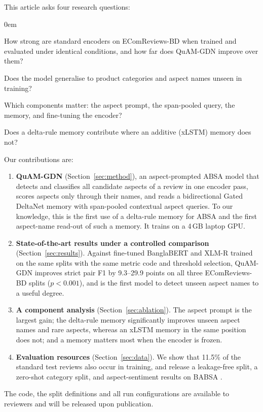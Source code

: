 \documentclass[11pt]{article}
\newcommand{\quam}{QuAM-GDN}
\begin{document}
This article asks four research questions:
\begin{description}
  \itemsep0em
  \item[RQ1] How strong are standard encoders on EComReviews-BD when trained and evaluated under
  identical conditions, and how far does \quam{} improve over them?
  \item[RQ2] Does the model generalise to product categories and aspect names unseen in training?
  \item[RQ3] Which components matter: the aspect prompt, the span-pooled query, the memory, and
  fine-tuning the encoder?
  \item[RQ4] Does a delta-rule memory contribute where an additive (xLSTM) memory does not?
\end{description}

Our contributions are:
\begin{enumerate}
  \itemsep0em
  \item \textbf{\quam{}} (Section~\ref{sec:method}), an aspect-prompted ABSA model that detects and
  classifies all candidate aspects of a review in one encoder pass, scores aspects only through their
  names, and reads a bidirectional Gated DeltaNet memory with span-pooled contextual aspect queries.
  To our knowledge, this is the first use of a delta-rule memory for ABSA and the first aspect-name
  read-out of such a memory. It trains on a 4\,GB laptop GPU.
  \item \textbf{State-of-the-art results under a controlled comparison} (Section~\ref{sec:results}).
  Against fine-tuned BanglaBERT and XLM-R trained on the same splits with the same metric code and
  threshold selection, \quam{} improves strict pair F1 by 9.3--29.9 points on all three EComReviews-BD
  splits ($p<0.001$), and is the first model to detect unseen aspect names to a useful degree.
  \item \textbf{A component analysis} (Section~\ref{sec:ablation}). The aspect prompt is the largest
  gain; the delta-rule memory significantly improves unseen aspect names and rare aspects, whereas an
  xLSTM memory in the same position does not; and a memory matters most when the encoder is frozen.
  \item \textbf{Evaluation resources} (Section~\ref{sec:data}). We show that 11.5\% of the standard
  test reviews also occur in training, and release a leakage-free split, a zero-shot category split,
  and aspect-sentiment results on BABSA \citep{rohman2025babsa}.
\end{enumerate}
The code, the split definitions and all run configurations are available to reviewers and will be
released upon publication.
\end{document}
